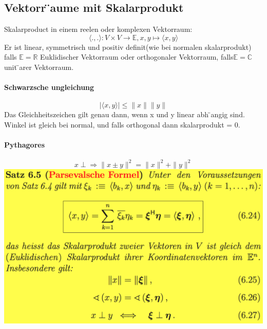 \documentclass[11pt]{article}
\newcommand\back[1][-3cm]{\hspace*{#1}}
\begin{document}
\subsection{Vektorr ̈aume mit Skalarprodukt}
Skalarproduct in einem reelen oder komplexen Vektorraum:
\begin{equation}
	\langle.,.\rangle:V\times V \rightarrow \mathbb{E}, x,y \mapsto \langle x, y \rangle
\end{equation}
Er ist linear, symmetrisch und positiv definit(wie bei normalen skalarprodukt)\\
falls $\mathbb{E} = \mathbb{R}$ Euklidischer Vektorraum oder orthogonaler Vektorraum, falls$\mathbb{E} = \mathbb{C}$ unit ̈arer Vektorraum.
\paragraph{Schwarzsche ungleichung}
\begin{equation}
	\mid\langle x, y \rangle\mid \leq \parallel x \parallel \parallel y \parallel 
\end{equation}
Das Gleichheitszeichen gilt genau dann, wenn x und y linear
abh ̈angig sind.\\
Winkel ist gleich bei normal, und falls orthogonal dann skalarprodukt = 0.
\paragraph{Pythagores}
\begin{equation}
	x\perp \Rightarrow \parallel x\pm y \parallel^2 = \parallel x\parallel^2 + \parallel y \parallel^2
\end{equation}
\back\includegraphics{images/parsevelsche}\\
\end{document}
